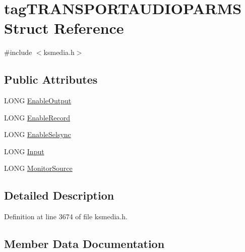 \hypertarget{structtag_t_r_a_n_s_p_o_r_t_a_u_d_i_o_p_a_r_m_s}{}\section{tag\+T\+R\+A\+N\+S\+P\+O\+R\+T\+A\+U\+D\+I\+O\+P\+A\+R\+MS Struct Reference}
\label{structtag_t_r_a_n_s_p_o_r_t_a_u_d_i_o_p_a_r_m_s}


{\ttfamily \#include $<$ksmedia.\+h$>$}

\subsection*{Public Attributes}
\begin{DoxyCompactItemize}
\item 
L\+O\+NG \hyperlink{structtag_t_r_a_n_s_p_o_r_t_a_u_d_i_o_p_a_r_m_s_ae82f3a735ff94e142f4fb7e0c1fad39d}{Enable\+Output}
\item 
L\+O\+NG \hyperlink{structtag_t_r_a_n_s_p_o_r_t_a_u_d_i_o_p_a_r_m_s_addbea4e7ecd2e7a3977089427ff2ba24}{Enable\+Record}
\item 
L\+O\+NG \hyperlink{structtag_t_r_a_n_s_p_o_r_t_a_u_d_i_o_p_a_r_m_s_a06c656cd062b74af0aaabbab616b1962}{Enable\+Selsync}
\item 
L\+O\+NG \hyperlink{structtag_t_r_a_n_s_p_o_r_t_a_u_d_i_o_p_a_r_m_s_a9c4539e21e89b4e240ca73de649d3123}{Input}
\item 
L\+O\+NG \hyperlink{structtag_t_r_a_n_s_p_o_r_t_a_u_d_i_o_p_a_r_m_s_a5702b464a277175e2db4831bc9399684}{Monitor\+Source}
\end{DoxyCompactItemize}


\subsection{Detailed Description}


Definition at line 3674 of file ksmedia.\+h.



\subsection{Member Data Documentation}

